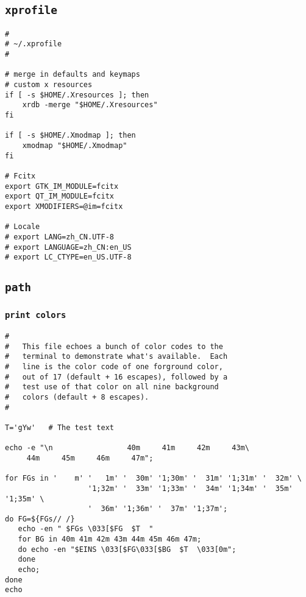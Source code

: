 \documentclass[11pt]{article}
\begin{document}
\subsection{\texttt{xprofile}}
\label{sec:org042f4c9}

\lstset{language=bash,label= ,caption= ,captionpos=b,numbers=none}
\begin{lstlisting}
#
# ~/.xprofile
#

# merge in defaults and keymaps
# custom x resources
if [ -s $HOME/.Xresources ]; then
    xrdb -merge "$HOME/.Xresources"
fi

if [ -s $HOME/.Xmodmap ]; then
    xmodmap "$HOME/.Xmodmap"
fi

# Fcitx
export GTK_IM_MODULE=fcitx
export QT_IM_MODULE=fcitx
export XMODIFIERS=@im=fcitx

# Locale
# export LANG=zh_CN.UTF-8
# export LANGUAGE=zh_CN:en_US
# export LC_CTYPE=en_US.UTF-8
\end{lstlisting}

\subsection{\texttt{path}}
\label{sec:orgaa49e96}

\subsubsection{\texttt{print colors}}
\label{sec:org6f43969}

\lstset{language=bash,label= ,caption= ,captionpos=b,numbers=none}
\begin{lstlisting}
#
#   This file echoes a bunch of color codes to the
#   terminal to demonstrate what's available.  Each
#   line is the color code of one forground color,
#   out of 17 (default + 16 escapes), followed by a
#   test use of that color on all nine background
#   colors (default + 8 escapes).
#

T='gYw'   # The test text

echo -e "\n                 40m     41m     42m     43m\
     44m     45m     46m     47m";

for FGs in '    m' '   1m' '  30m' '1;30m' '  31m' '1;31m' '  32m' \
                   '1;32m' '  33m' '1;33m' '  34m' '1;34m' '  35m' '1;35m' \
                   '  36m' '1;36m' '  37m' '1;37m';
do FG=${FGs// /}
   echo -en " $FGs \033[$FG  $T  "
   for BG in 40m 41m 42m 43m 44m 45m 46m 47m;
   do echo -en "$EINS \033[$FG\033[$BG  $T  \033[0m";
   done
   echo;
done
echo
\end{lstlisting}
\end{document}
